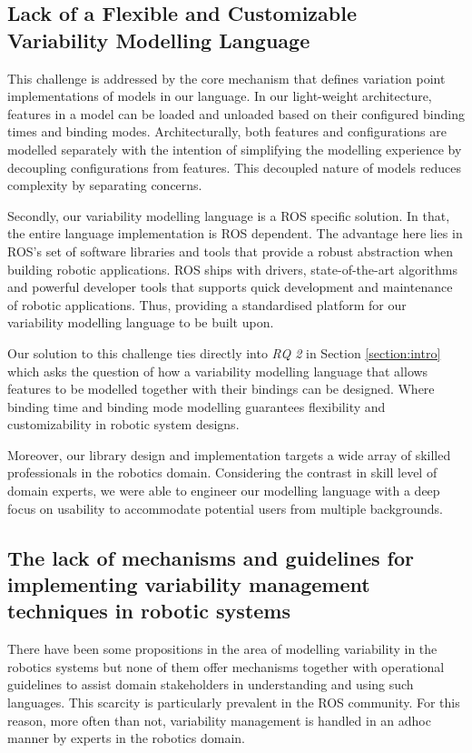 \documentclass[conference]{IEEEtran}
\begin{document}
\subsection{Lack of a Flexible and Customizable Variability Modelling Language}
This challenge is addressed by the core mechanism that defines variation point implementations of models in our language. In our light-weight architecture, features in a model can be loaded and unloaded based on their configured binding times and binding modes. Architecturally, both features and configurations are modelled separately with the intention of simplifying the modelling experience by decoupling configurations from features. This decoupled nature of models reduces complexity by separating concerns.

Secondly, our variability modelling language is a ROS specific solution. In that, the entire language implementation is ROS dependent. The advantage here lies in ROS's set of software libraries and tools that provide a robust abstraction when building robotic applications. ROS ships with drivers, state-of-the-art algorithms and powerful developer tools that supports quick development and maintenance of robotic applications. Thus, providing a standardised platform for our variability modelling language to be built upon.

Our solution to this challenge ties directly into \textit{RQ 2} in Section \ref{section:intro} which asks the question of how a variability modelling language that allows features to be modelled together with their bindings can be designed. Where binding time and binding mode modelling guarantees flexibility and customizability in robotic system designs.

Moreover, our library design and implementation targets a wide array of skilled professionals in the robotics domain. Considering the contrast in skill level of domain experts, we were able to engineer our modelling language with a deep focus on usability to accommodate potential users from multiple backgrounds.

\subsection{The lack of mechanisms and guidelines for implementing variability management techniques in robotic systems}
There have been some propositions in the area of modelling variability in the robotics systems but none of them offer mechanisms together with operational guidelines to assist domain stakeholders in understanding and using such languages. This scarcity is particularly prevalent in the ROS community. For this reason, more often than not, variability management is handled in an adhoc manner by experts in the robotics domain.
\end{document}
